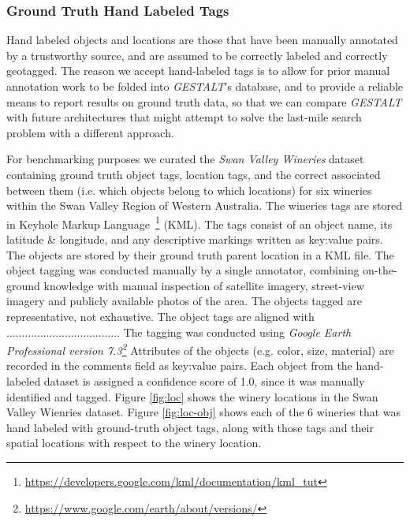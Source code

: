 \subsubsection{Ground Truth Hand Labeled Tags} 
Hand labeled objects and locations are those that have been manually annotated by a trustworthy source, and are assumed to be correctly labeled and correctly geotagged. 
The reason we accept hand-labeled tags is to allow for prior manual annotation work to be folded into \emph{GESTALT}'s database, and to provide a reliable means to report results on ground truth data, so that we can compare \emph{GESTALT} with future architectures that might attempt to solve the last-mile search problem with a different approach. 

For benchmarking purposes we curated the \emph{Swan Valley Wineries} dataset containing ground truth object tags, location tags, and the correct associated between them (i.e. which objects belong to which locations) for six wineries within the Swan Valley Region of Western Australia.
The wineries tags are stored in Keyhole Markup Language~\footnote{\href{https://developers.google.com/kml/documentation/kml\_tut}{https://developers.google.com/kml/documentation/kml\_tut}} (KML).
The tags consist of an object name, its latitude \& longitude, and any descriptive markings written as key:value pairs. The objects are stored by their ground truth parent location in a KML file.
The object tagging was conducted manually by a single annotator, combining on-the-ground knowledge with manual inspection of satellite imagery, street-view imagery and publicly available photos of the area. 
The objects tagged are representative, not exhaustive. 
The object tags are aligned with ..................................... 
The tagging was conducted using \textit{Google Earth Professional version 7.3\footnote{\href{https://www.google.com/earth/about/versions/}{https://www.google.com/earth/about/versions/}}}
Attributes of the objects (e.g. color, size, material) are recorded in the comments field as key:value pairs.
Each object from the hand-labeled dataset is assigned a confidence score of 1.0, since it was manually identified and tagged.
Figure \ref{fig:loc} shows the winery locations in the Swan Valley Wienries dataset. 
Figure \ref{fig:loc-obj} shows each of the 6 wineries that was hand labeled with ground-truth object tags, along with those tags and their spatial locations with respect to the winery location.



